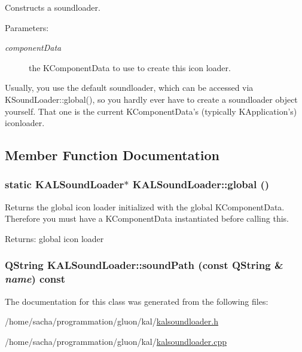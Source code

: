 Constructs a soundloader. \begin{Desc}
\item[Parameters:]
\begin{description}
\item[{\em componentData}]the KComponentData to use to create this icon loader.\end{description}
\end{Desc}
Usually, you use the default soundloader, which can be accessed via KSoundLoader::global(), so you hardly ever have to create a soundloader object yourself. That one is the current KComponentData's (typically KApplication's) iconloader. 

\subsection{Member Function Documentation}
\hypertarget{class_k_a_l_sound_loader_369cbbc9830906fdf401a2ad333bae3a}{
\subsubsection[{global}]{\setlength{\rightskip}{0pt plus 5cm}static {\bf KALSoundLoader}$\ast$ KALSoundLoader::global ()}}
\label{class_k_a_l_sound_loader_369cbbc9830906fdf401a2ad333bae3a}


Returns the global icon loader initialized with the global KComponentData. Therefore you must have a KComponentData instantiated before calling this. \begin{Desc}
\item[Returns:]global icon loader \end{Desc}
\hypertarget{class_k_a_l_sound_loader_7224c83e67c68b8dd4bc485ab5d697cd}{
\subsubsection[{soundPath}]{\setlength{\rightskip}{0pt plus 5cm}QString KALSoundLoader::soundPath (const QString \& {\em name}) const}}
\label{class_k_a_l_sound_loader_7224c83e67c68b8dd4bc485ab5d697cd}




The documentation for this class was generated from the following files:\begin{CompactItemize}
\item 
/home/sacha/programmation/gluon/kal/\hyperlink{kalsoundloader_8h}{kalsoundloader.h}\item 
/home/sacha/programmation/gluon/kal/\hyperlink{kalsoundloader_8cpp}{kalsoundloader.cpp}\end{CompactItemize}
